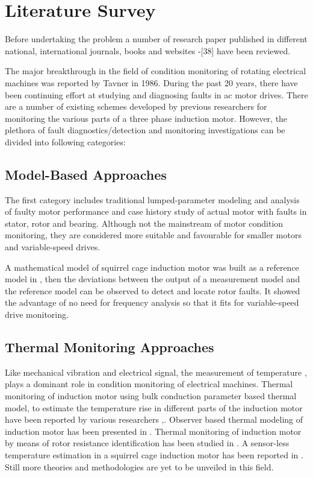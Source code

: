 \documentclass[a4paper,11pt]{article}
\begin{document}
\section{Literature Survey}
Before undertaking the problem a number of research paper published in different national, international journals, books and websites \cite{Penman}-[38] have been reviewed.

The major breakthrough in the field of condition monitoring of rotating electrical machines was reported by Tavner \cite{rps1} in 1986. During the past 20 years, there have been continuing effort at studying and diagnosing faults in ac motor drives. There are a number of existing schemes developed by previous researchers for monitoring the various parts of a three phase induction motor. However, the plethora of fault diagnostics/detection and monitoring investigations can be divided into following categories: 

\subsection{Model-Based Approaches}
The first category includes traditional lumped-parameter modeling and analysis of faulty motor performance and case history study of actual motor with faults in stator, rotor and bearing. Although not the mainstream of motor condition monitoring, they are considered more suitable and favourable for smaller motors and variable-speed drives.

A mathematical model of squirrel cage induction motor was built as a reference model in \cite{70}, then the deviations between the output of a measurement model and the reference model can be observed to detect and locate rotor faults. It showed the advantage of no need for frequency analysis so that it fits for variable-speed drive monitoring.

\subsection{Thermal Monitoring Approaches}
Like mechanical vibration and electrical signal, the measurement of temperature \cite{rps2},\cite{rps3} plays a dominant role in condition monitoring of electrical machines. Thermal monitoring of induction motor using bulk conduction parameter based thermal model, to estimate the temperature rise in different parts of the induction motor have been reported by various researchers \cite{rps3},\cite{rps17}. Observer based thermal modeling of induction motor has been presented in \cite{rps19}. Thermal monitoring of induction motor by means of rotor resistance identification has been studied in \cite{rps28}. A sensor-less temperature estimation in a squirrel cage induction motor has been reported in \cite{rps27}. Still more theories and methodologies are yet to be unveiled in this field.
\end{document}

